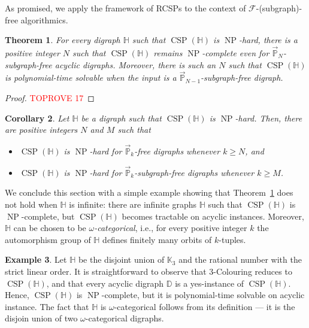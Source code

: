 \documentclass{article}
\newtheorem{theorem}{Theorem}
\newtheorem{corollary}[theorem]{Corollary}
\theoremstyle{definition}
\newtheorem{example}[theorem]{Example}
\theoremstyle{remark}
\DeclareMathOperator{\NP}{NP}
\DeclareMathOperator{\CSP}{CSP}
\newcommand{\bD}{{\mathbb D}}
\newcommand{\bH}{{\mathbb H}}
\newcommand{\bK}{{\mathbb K}}
\newcommand{\bP}{{\mathbb P}}
\newcommand{\calF}{{\mathcal F}}
\newcommand{\COL}[1]{{\sc ${#1}$-Colouring}}
\begin{document}
As promised, we apply the framework of RCSPs to the context of $\calF$-(subgraph)-free
algorithmics.


\begin{theorem}\label{thm:acyclic+bounded-paths}
 For every digraph $\bH$ such that $\CSP(\bH)$ is $\NP$-hard, there is a positive integer
    $N$ such that $\CSP(\bH)$ remains $\NP$-complete even for $\vec{\bP}_N$-subgraph-free
    acyclic digraphs. Moreover, there is such an $N$ such that $\CSP(\bH)$ is polynomial-time
    solvable when the input is a $\vec{\bP}_{N-1}$-subgraph-free digraph.
\end{theorem}
\begin{proof}\textcolor{red}{TOPROVE 17}\end{proof}

\begin{corollary}\label{thm:digraph-}
    Let $\bH$ be a digraph such that $\CSP(\bH)$ is $\NP$-hard. Then, there are positive
    integers $N$ and $M$ such that
    \begin{itemize}
        \item $\CSP(\bH)$ is $\NP$-hard for $\vec{\bP}_k$-free digraphs whenever $k\ge N$, and
        \item $\CSP(\bH)$ is $\NP$-hard for $\vec{\bP}_k$-subgraph-free digraphs whenever $k\ge M$.
    \end{itemize}
\end{corollary}

We conclude this section with a simple example showing that Theorem~\ref{thm:acyclic+bounded-paths}
does not hold when $\bH$ is infinite: there are infinite graphs $\bH$ such that 
$\CSP(\bH)$ is $\NP$-complete, but $\CSP(\bH)$ becomes tractable on acyclic instances.
Moreover, $\bH$ can be chosen to be \emph{$\omega$-categorical}, i.e., 
for every positive integer $k$ the automorphism group of $\bH$ defines finitely many orbits
of $k$-tuples.

\begin{example}\label{ex:infinite-acyclic}
    Let $\bH$ be the disjoint union of $\bK_3$ and the rational number with the strict linear order. 
    It is straightforward to observe that \COL{3} reduces to $\CSP(\bH)$, and that
    every acyclic digraph $\bD$ is a yes-instance of $\CSP(\bH)$. Hence, 
    $\CSP(\bH)$ is $\NP$-complete, but it is polynomial-time solvable on acyclic instance.
    The fact that $\bH$ is $\omega$-categorical follows from its definition --- it is the
    disjoin union of two $\omega$-categorical digraphs.
\end{example}
\end{document}
